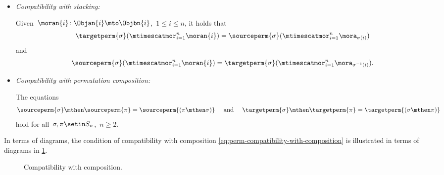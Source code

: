 \begin{ctdefinition}
\begin{itemize}
        \item \emph{Compatibility with stacking:}

              Given~$\moran{i} \colon \Objan{i} \mto \Objbn{i}$,~$1 \leq i \leq n$, it holds that
              \begin{equation}
                  \label{eq:perm-compatibility-with-stacking-1}
                  \targetperm{\sigma} ( \mtimescatmor_{i=1}^n \moran{i} ) = \sourceperm{\sigma}(  \mtimescatmor_{i=1}^n \mora_{\sigma(i)} )
              \end{equation}
              and
              \begin{equation}
                  \label{eq:perm-compatibility-with-stacking-2}
                  \sourceperm{\sigma} ( \mtimescatmor_{i=1}^n \moran{i} ) = \targetperm{\sigma} (  \mtimescatmor_{i=1}^n \mora_{\sigma^{-1}(i)} ).
              \end{equation}

        \item \emph{Compatibility with permutation composition:}

              The equations
              \begin{equation}
                  \label{eq:perm-compatibility-with-perm-comp}
                  \sourceperm{\sigma} \mthen \sourceperm{\pi} = \sourceperm{(\pi\mthen\sigma)}
                  \quad \text{ and } \quad
                  \targetperm{\sigma} \mthen \targetperm{\pi} = \targetperm{(\sigma \mthen \pi)}
              \end{equation}
              hold for all~$\sigma, \pi \setin S_n$,~$n \geq 2$.

    \end{itemize}
\end{ctdefinition}

In terms of diagrams, the condition of compatibility with composition \cref{eq:perm-compatibility-with-composition} is illustrated in terms of diagrams in \cref{fig:symmetric-stacking-comp-compat}.

\begin{figure}[h]
    \centering
     \qquad \qquad
    \caption{Compatibility with composition. }
    \label{fig:symmetric-stacking-comp-compat}
\end{figure}

